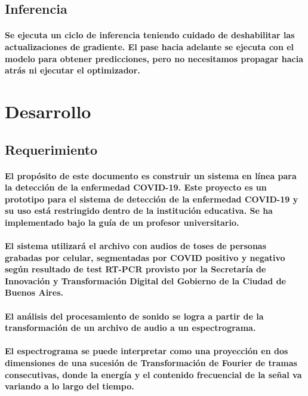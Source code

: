 \documentclass[a4paper,12pt]{article}
\begin{document}
\subsection{Inferencia}
\paragraph{Se ejecuta un ciclo de inferencia teniendo cuidado de deshabilitar las actualizaciones de gradiente. El pase hacia adelante se ejecuta con el modelo para obtener predicciones, pero no necesitamos propagar hacia atrás ni ejecutar el optimizador.}
\section{Desarrollo}
\subsection{Requerimiento}
\paragraph{El propósito de este documento es construir un sistema en línea para la detección de la enfermedad COVID-19.
Este proyecto es un prototipo para el sistema de detección de la enfermedad COVID-19 y su uso está restringido dentro de la institución educativa. Se ha implementado bajo la guía de un profesor universitario.}
\paragraph{El sistema utilizará el archivo con audios de toses de personas grabadas por celular, segmentadas por COVID positivo y negativo según resultado de test RT-PCR provisto por la Secretaría de Innovación y Transformación Digital del Gobierno de la Ciudad de Buenos Aires\cite{dataset}.}
\paragraph{El análisis del procesamiento de sonido se logra a partir de la transformación de un archivo de audio a un espectrograma.\cite{espectrograma}}
\paragraph{El espectrograma se puede interpretar como una proyección en dos dimensiones de una sucesión de Transformación de Fourier\cite{fourier} de tramas consecutivas, donde la energía y el contenido frecuencial de la señal va variando a lo largo del tiempo.}
\end{document}
